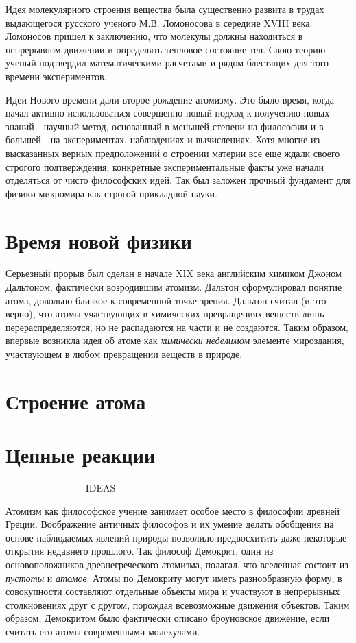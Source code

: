 Идея молекулярного строения вещества была существенно развита в трудах выдающегося русского ученого М.В. Ломоносова в середине XVIII века.
Ломоносов пришел к заключению, что молекулы должны находиться в непрерывном движении и определять тепловое состояние тел.
Свою теорию ученый подтвердил математическими расчетами и рядом блестящих для того времени экспериментов.

Идеи Нового времени дали второе рождение атомизму.
Это было время, когда начал активно использоваться совершенно новый подход к получению новых знаний - научный метод, основанный в меньшей степени на философии и в большей - на экспериментах, наблюдениях и вычислениях.
Хотя многие из высказанных верных предположений о строении материи все еще ждали своего строгого подтверждения, конкретные экспериментальные факты уже начали отделяться от чисто философских идей.
Так был заложен прочный фундамент для физики микромира как строгой прикладной науки. 


\section*{Время новой физики}

Серьезный прорыв был сделан в начале XIX века английским химиком Джоном Дальтоном, фактически возродившим атомизм. 
Дальтон сформулировал понятие атома, довольно близкое к современной точке зрения. 
Дальтон считал (и это верно), что атомы участвующих в химических превращениях веществ лишь перераспределяются, но не распадаются на части и не создаются. 
Таким образом, впервые возникла идея об атоме как \textit{химически неделимом} элементе мироздания, участвующем в любом превращении веществ в природе.


\section*{Строение атома}


\section*{Цепные реакции}


------------------------ IDEAS ------------------------ 





Атомизм как философское учение занимает особое место в философии древней Греции.
Воображение античных философов и их умение делать обобщения на основе наблюдаемых явлений природы позволило предвосхитить даже некоторые открытия недавнего прошлого.
Так философ Демокрит, один из основоположников древнегреческого атомизма, полагал, что вселенная состоит из \textit{пустоты} и \textit{атомов}. Атомы по Демокриту могут иметь разнообразную форму, в совокупности составляют отдельные объекты мира и участвуют в непрерывных столкновениях друг с другом, порождая всевозможные движения объектов.
Таким образом, Демокритом было фактически описано броуновское движение, если считать его атомы современными молекулами.


